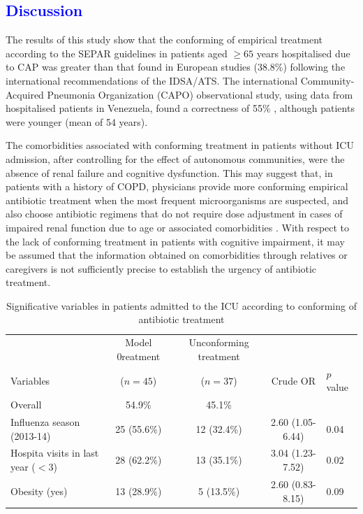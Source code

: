 \documentclass[11pt, a4paper]{article}
\begin{document}
\begin{multicols}{2}

\section*{\textcolor{blue}{Discussion}}
The results of this study show that the conforming of empirical treatment according to the SEPAR guidelines in patients aged $\geq65$ years hospitalised due to CAP was greater than that found in European studies (38.8\%) \cite{rossio2015adherence} following the international recommendations of the IDSA/ATS. The international Community-Acquired Pneumonia Organization (CAPO) observational study, using data from hospitalised patients in Venezuela, found a correctness of 55\% \cite{levy2015cumplimiento}, although patients were younger (mean of 54 years).

The comorbidities associated with conforming treatment in patients without ICU admission, after controlling for the effect of autonomous communities, were the absence of renal failure and cognitive dysfunction. This may suggest that, in patients with a history of COPD, physicians provide more conforming empirical antibiotic treatment when the most frequent microorganisms are suspected, and also choose antibiotic regimens that do not require dose adjustment in cases of impaired renal function due to age or associated comorbidities \cite{petrosillo2015treatment}. With respect to the lack of conforming treatment in patients with cognitive impairment, it may be assumed that the information obtained on comorbidities through relatives or caregivers is not sufficiently precise to establish the urgency of antibiotic treatment.

\end{multicols}

\begin{table}[hbt!]
\centering
\scalebox{0.85}
{
\begin{tabular}{lccc}
\hline
& Model 0reatment & Unconforming treatment & & \\
Variables & ($n=45$) & ($n=37$) & Crude OR & $p$ value \\
\hline
Overall
& 54.9\%
& 45.1\%
& & \\
Influenza season (2013-14) 
& 25 (55.6\%)
& 12 (32.4\%) 
& 2.60 (1.05-6.44)
& 0.04 \\
Hospita visits in last year ($<3$)
& 28 (62.2\%)
& 13 (35.1\%) 
& 3.04 (1.23-7.52)
& 0.02 \\ 
Obesity (yes)
& 13 (28.9\%)
& 5 (13.5\%)
& 2.60 (0.83-8.15)
& 0.09 \\
\hline
\end{tabular}
}
\caption{\footnotesize Significative variables in patients admitted to the ICU according to conforming of antibiotic treatment}
\label{tab:tabla_uci}
\end{table}
\end{document}
